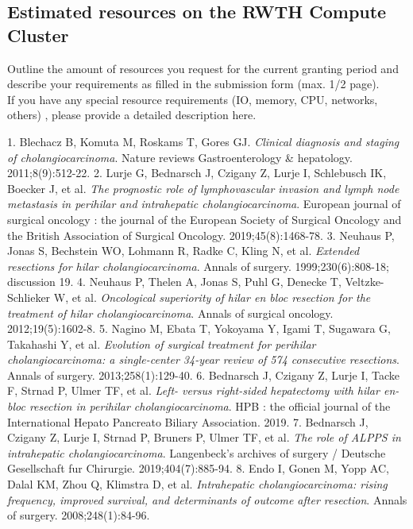 \documentclass[12pt]{article}
\begin{document}
\subsection{Estimated resources on the RWTH Compute Cluster}
Outline the amount of resources you request for the current granting period and describe your requirements as filled in the submission form (max. 1/2 page).\\
If you have any special resource requirements (IO, memory, CPU, networks, others) , please provide a detailed description here.

\begin{thebibliography}{22}
1.	Blechacz B, Komuta M, Roskams T, Gores GJ. \textit{Clinical diagnosis and staging of cholangiocarcinoma}. Nature reviews Gastroenterology \& hepatology. 2011;8(9):512-22.
2.	Lurje G, Bednarsch J, Czigany Z, Lurje I, Schlebusch IK, Boecker J, et al. \textit{The prognostic role of lymphovascular invasion and lymph node metastasis in perihilar and intrahepatic cholangiocarcinoma}. European journal of surgical oncology : the journal of the European Society of Surgical Oncology and the British Association of Surgical Oncology. 2019;45(8):1468-78.
3.	Neuhaus P, Jonas S, Bechstein WO, Lohmann R, Radke C, Kling N, et al. \textit{Extended resections for hilar cholangiocarcinoma}. Annals of surgery. 1999;230(6):808-18; discussion 19.
4.	Neuhaus P, Thelen A, Jonas S, Puhl G, Denecke T, Veltzke-Schlieker W, et al. \textit{Oncological superiority of hilar en bloc resection for the treatment of hilar cholangiocarcinoma}. Annals of surgical oncology. 2012;19(5):1602-8.
5.	Nagino M, Ebata T, Yokoyama Y, Igami T, Sugawara G, Takahashi Y, et al. \textit{Evolution of surgical treatment for perihilar cholangiocarcinoma: a single-center 34-year review of 574 consecutive resections}. Annals of surgery. 2013;258(1):129-40.
6.	Bednarsch J, Czigany Z, Lurje I, Tacke F, Strnad P, Ulmer TF, et al. \textit{Left- versus right-sided hepatectomy with hilar en-bloc resection in perihilar cholangiocarcinoma}. HPB : the official journal of the International Hepato Pancreato Biliary Association. 2019.
7.	Bednarsch J, Czigany Z, Lurje I, Strnad P, Bruners P, Ulmer TF, et al. \textit{The role of ALPPS in intrahepatic cholangiocarcinoma}. Langenbeck's archives of surgery / Deutsche Gesellschaft fur Chirurgie. 2019;404(7):885-94.
8.	Endo I, Gonen M, Yopp AC, Dalal KM, Zhou Q, Klimstra D, et al. \textit{Intrahepatic cholangiocarcinoma: rising frequency, improved survival, and determinants of outcome after resection}. Annals of surgery. 2008;248(1):84-96.

\end{thebibliography}
\end{document}
